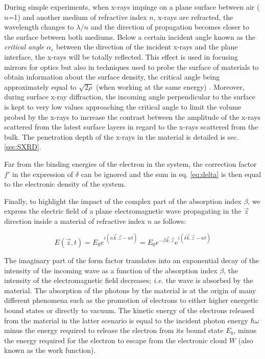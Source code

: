 During simple experiments, when x-rays impinge on a plane surface between air ($n$=1) and another medium of refractive index $n$, x-rays are refracted, the wavelength changes to $\lambda/n$ and the direction of propagation becomes closer to the surface between both mediums.
Below a certain incident angle known as the \textit{critical angle} $\alpha_c$ between the direction of the incident x-rays and the plane interface, the x-rays will be totally reflected.
This effect is used in focusing mirrors for optics but also in techniques used to probe the surface of materials to obtain information about the surface density, the critical angle being approximately equal to $\sqrt{2\rho}$ (when working at the same energy) \parencite{Willmott}.
Moreover, during surface x-ray diffraction, the incoming angle perpendicular to the surface is kept to very low values approaching the critical angle to limit the volume probed by the x-rays to increase the contrast between the amplitude of the x-rays scattered from the latest surface layers in regard to the x-rays scattered from the bulk.
The penetration depth of the x-rays in the material is detailed is sec. \ref{sec:SXRD}.

Far from the binding energies of the electron in the system, the correction factor $f'$ in the expression of $\delta$ can be ignored and the sum in eq. \ref{eq:delta} is then equal to the electronic density of the system.

Finally, to highlight the impact of the complex part of the absorption index $\beta$, we express the electric field of a plane electromagnetic wave propagating in the $\vec{z}$ direction inside a material of refractive index $n$ as follows:

\begin{equation}
    E(\vec{z}, t) = E_0 e^{i(n\vec{k}.\vec{z} - wt)} = E_0 e^{-\beta \vec{k}.\vec{z}} e^{i(\delta\vec{k}.\vec{z} - wt)}
\end{equation}

The imaginary part of the form factor translates into an exponential decay of the intensity of the incoming wave as a function of the absorption index $\beta$, the intensity of the electromagnetic field decreases; \textit{i.e.} the wave is absorbed by the material.
The absorption of the photons by the material is at the origin of many different phenomena such as the promotion of electrons to either higher energetic bound states or directly to vacuum.
The kinetic energy of the electrons released from the material in the latter scenario is equal to the incident photon energy $\hbar\omega$ minus the energy required to release the electron from its bound state $E_b$, minus the energy required for the electron to escape from the electronic cloud $W$ (also known as the work function).

